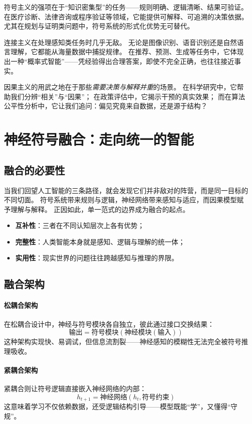 符号主义的强项在于“知识密集型”的任务——规则明确、逻辑清晰、结果可验证。  
在医疗诊断、法律咨询或程序验证等领域，它能提供可解释、可追溯的决策依据。  
尤其在规划与证明类问题中，符号系统的形式化优势无可替代。

连接主义在处理感知类任务时几乎无敌。  
无论是图像识别、语音识别还是自然语言理解，它都能从海量数据中捕捉规律。  
在推荐、预测、生成等任务中，它体现出一种“概率式智能”——凭经验得出合理答案，即使不完全正确，也往往接近事实。

因果主义的用武之地在于那些\emph{需要决策与解释并重}的场景。  
在科学研究中，它帮助我们分辨“相关”与“因果”；  
在政策评估中，它揭示干预的真实效果；  
而在算法公平性分析中，它让我们追问：偏见究竟来自数据，还是源于结构？  

\section{神经符号融合：走向统一的智能}

\subsection{融合的必要性}

当我们回望人工智能的三条路径，就会发现它们并非敌对的阵营，而是同一目标的不同切面。  
符号系统带来规则与逻辑，神经网络带来感知与适应，而因果模型赋予理解与解释。  
正因如此，单一范式的边界成为融合的起点。  
\begin{itemize}
\item \textbf{互补性}：三者在不同认知层次上各有优势；  
\item \textbf{完整性}：人类智能本身就是感知、逻辑与理解的统一体；  
\item \textbf{实用性}：现实世界的问题往往跨越感知与推理的界限。  
\end{itemize}

\subsection{融合架构}

\paragraph{松耦合架构}
在松耦合设计中，神经与符号模块各自独立，彼此通过接口交换结果：  
$$\text{输出} = \text{符号模块}(\text{神经模块}(\text{输入}))$$
这种架构实现快、易调试，但信息流割裂——神经感知的模糊性无法完全被符号推理吸收。

\paragraph{紧耦合架构}
紧耦合则让符号逻辑直接嵌入神经网络的内部：  
$$h_{t+1} = \text{神经网络}(h_t, \text{符号约束})$$
这意味着学习不仅依赖数据，还受逻辑结构引导——模型既能“学”，又懂得“守规”。

